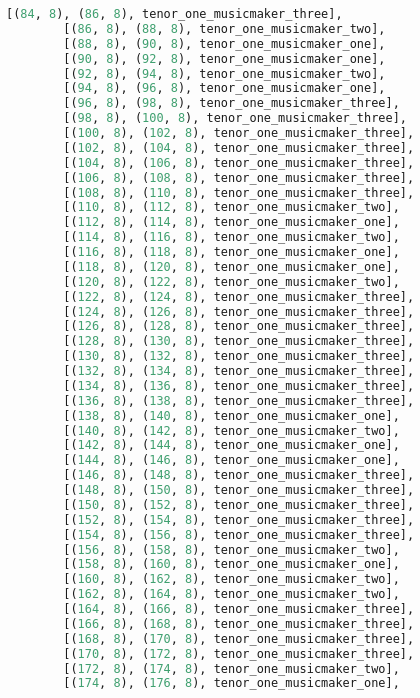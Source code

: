 \begin{lstlisting}[language=Python, caption=Invocation Source Code]
        [(84, 8), (86, 8), tenor_one_musicmaker_three],
        [(86, 8), (88, 8), tenor_one_musicmaker_two],
        [(88, 8), (90, 8), tenor_one_musicmaker_one],
        [(90, 8), (92, 8), tenor_one_musicmaker_one],
        [(92, 8), (94, 8), tenor_one_musicmaker_two],
        [(94, 8), (96, 8), tenor_one_musicmaker_one],
        [(96, 8), (98, 8), tenor_one_musicmaker_three],
        [(98, 8), (100, 8), tenor_one_musicmaker_three],
        [(100, 8), (102, 8), tenor_one_musicmaker_three],
        [(102, 8), (104, 8), tenor_one_musicmaker_three],
        [(104, 8), (106, 8), tenor_one_musicmaker_three],
        [(106, 8), (108, 8), tenor_one_musicmaker_three],
        [(108, 8), (110, 8), tenor_one_musicmaker_three],
        [(110, 8), (112, 8), tenor_one_musicmaker_two],
        [(112, 8), (114, 8), tenor_one_musicmaker_one],
        [(114, 8), (116, 8), tenor_one_musicmaker_two],
        [(116, 8), (118, 8), tenor_one_musicmaker_one],
        [(118, 8), (120, 8), tenor_one_musicmaker_one],
        [(120, 8), (122, 8), tenor_one_musicmaker_two],
        [(122, 8), (124, 8), tenor_one_musicmaker_three],
        [(124, 8), (126, 8), tenor_one_musicmaker_three],
        [(126, 8), (128, 8), tenor_one_musicmaker_three],
        [(128, 8), (130, 8), tenor_one_musicmaker_three],
        [(130, 8), (132, 8), tenor_one_musicmaker_three],
        [(132, 8), (134, 8), tenor_one_musicmaker_three],
        [(134, 8), (136, 8), tenor_one_musicmaker_three],
        [(136, 8), (138, 8), tenor_one_musicmaker_three],
        [(138, 8), (140, 8), tenor_one_musicmaker_one],
        [(140, 8), (142, 8), tenor_one_musicmaker_two],
        [(142, 8), (144, 8), tenor_one_musicmaker_one],
        [(144, 8), (146, 8), tenor_one_musicmaker_one],
        [(146, 8), (148, 8), tenor_one_musicmaker_three],
        [(148, 8), (150, 8), tenor_one_musicmaker_three],
        [(150, 8), (152, 8), tenor_one_musicmaker_three],
        [(152, 8), (154, 8), tenor_one_musicmaker_three],
        [(154, 8), (156, 8), tenor_one_musicmaker_three],
        [(156, 8), (158, 8), tenor_one_musicmaker_two],
        [(158, 8), (160, 8), tenor_one_musicmaker_one],
        [(160, 8), (162, 8), tenor_one_musicmaker_two],
        [(162, 8), (164, 8), tenor_one_musicmaker_two],
        [(164, 8), (166, 8), tenor_one_musicmaker_three],
        [(166, 8), (168, 8), tenor_one_musicmaker_three],
        [(168, 8), (170, 8), tenor_one_musicmaker_three],
        [(170, 8), (172, 8), tenor_one_musicmaker_three],
        [(172, 8), (174, 8), tenor_one_musicmaker_two],
        [(174, 8), (176, 8), tenor_one_musicmaker_one],

\end{lstlisting}
